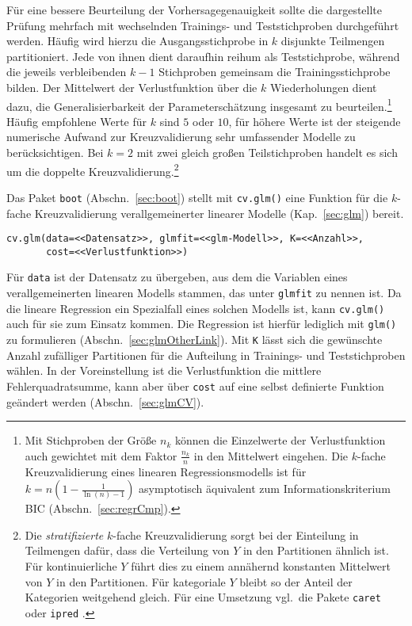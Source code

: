 Für eine bessere Beurteilung der Vorhersagegenauigkeit sollte die dargestellte Prüfung mehrfach mit wechselnden Trainings- und Teststichproben durchgeführt werden. Häufig wird hierzu die Ausgangsstichprobe in $k$ disjunkte Teilmengen partitioniert. Jede von ihnen dient daraufhin reihum als Teststichprobe, während die jeweils verbleibenden $k-1$ Stichproben gemeinsam die Trainingsstichprobe bilden. Der Mittelwert der Verlustfunktion über die $k$ Wiederholungen dient dazu, die Generalisierbarkeit der Parameterschätzung insgesamt zu beurteilen.\footnote{Mit Stichproben der Größe $n_{k}$ können die Einzelwerte der Verlustfunktion auch gewichtet mit dem Faktor $\frac{n_{k}}{n}$ in den Mittelwert eingehen. Die $k$-fache Kreuzvalidierung eines linearen Regressionsmodells ist für $k = n \left(1 - \frac{1}{\ln(n)-1}\right)$ asymptotisch äquivalent zum Informationskriterium BIC (Abschn.\ \ref{sec:regrCmp}).} Häufig empfohlene Werte für $k$ sind $5$ oder $10$, für höhere Werte ist der steigende numerische Aufwand zur Kreuzvalidierung sehr umfassender Modelle zu berücksichtigen. Bei $k = 2$ mit zwei gleich großen Teilstichproben handelt es sich um die doppelte Kreuzvalidierung.\footnote{Die \emph{stratifizierte} $k$-fache Kreuzvalidierung sorgt bei der Einteilung in Teilmengen dafür, dass die Verteilung von $Y$ in den Partitionen ähnlich ist. Für kontinuierliche $Y$ führt dies zu einem annähernd konstanten Mittelwert von $Y$ in den Partitionen. Für kategoriale $Y$ bleibt so der Anteil der Kategorien weitgehend gleich. Für eine Umsetzung vgl.\ die Pakete  \lstinline!caret! \cite{Kuhn2014} oder  \lstinline!ipred! \cite{Peters2013}.}

Das Paket \lstinline!boot! (Abschn.\ \ref{sec:boot}) stellt mit \lstinline!cv.glm()! eine Funktion für die $k$-fache Kreuzvalidierung verallgemeinerter linearer Modelle (Kap.\ \ref{sec:glm}) bereit.
\begin{lstlisting}
cv.glm(data=<<Datensatz>>, glmfit=<<glm-Modell>>, K=<<Anzahl>>,
       cost=<<Verlustfunktion>>)
\end{lstlisting}

Für \lstinline!data! ist der Datensatz zu übergeben, aus dem die Variablen eines verallgemeinerten linearen Modells stammen, das unter \lstinline!glmfit! zu nennen ist. Da die lineare Regression ein Spezialfall eines solchen Modells ist, kann \lstinline!cv.glm()! auch für sie zum Einsatz kommen. Die Regression ist hierfür lediglich mit \lstinline!glm()! zu formulieren (Abschn.\ \ref{sec:glmOtherLink}). Mit \lstinline!K! lässt sich die gewünschte Anzahl zufälliger Partitionen für die Aufteilung in Trainings- und Teststichproben wählen. In der Voreinstellung ist die Verlustfunktion die mittlere Fehlerquadratsumme, kann aber über \lstinline!cost! auf eine selbst definierte Funktion geändert werden (Abschn.\ \ref{sec:glmCV}).

